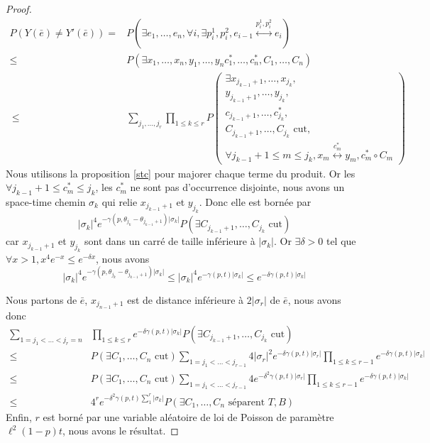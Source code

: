\documentclass[titlepage,a4paper,12pt]{article}
\newcounter{prop}
\begin{document}
\begin{proof}
\begin{align*}
P(Y(\bar{e})\neq Y'(\bar{e})) =& P(\exists e_1,\dots,e_n, \forall i, \exists p_i^1,p_i^2, e_{i-1}\overset{p_i^1,p_i^2}{\longleftrightarrow}e_i) \\
 \leqslant &P(\exists x_1,\dots,x_n,y_1,\dots,y_n c^*_1,\dots,c^*_n,C_1,\dots,C_n) \\\
 \leqslant &\sum_{j_1,\dots,j_r}\prod_{1\leqslant k \leqslant r} P\left(\begin{array}{c}
 \exists x_{j_{k-1}+1},\dots,x_{j_k},\\
 y_{j_{k-1}+1},\dots,y_{j_k},\\
 c_{j_{k-1}+1},\dots,c^*_{j_k},\\
 C_{j_{k-1}+1},\dots,C_{j_k} \text{ cut},\\
 \forall j_{k-1}+1 \leqslant m \leqslant j_k, x_m\overset{c^*_m}{\longleftrightarrow} y_m, 
 c^*_m\circ C_m
 \end{array}
 \right)
\end{align*}
Nous utilisons la proposition \ref{stc} pour majorer chaque terme du produit. Or les $\forall j_{k-1}+1 \leqslant c^*_m \leqslant j_k$, les $c^*_m$ ne sont pas d'occurrence disjointe, nous avons un space-time chemin $\sigma_k$ qui relie $x_{j_{k-1}+1}$ et $y_{j_k}$. Donc elle est bornée par $$ \displaystyle |\sigma_k|^4 e^{-\gamma(p,\theta_{j_k}-\theta_{j_{k-1}+1})|\sigma_k|} P(\exists C_{j_{k-1}+1},\dots,C_{j_k} \text{ cut})$$ car $x_{j_{k-1}+1}$ et $y_{j_k}$ sont dans un carré de taille inférieure à $ |\sigma_k|$. Or $\exists \delta>0$ tel que $\forall x>1, x^4e^{-x} \leqslant e^{-\delta x}$, nous avons 
$$|\sigma_k|^4 e^{-\gamma(p,\theta_{j_k}-\theta_{j_{k-1}+1})|\sigma_k|} \leqslant |\sigma_k|^4 e^{-\gamma(p,t)|\sigma_k|} \leqslant e^{-\delta\gamma(p,t)|\sigma_k|}$$

Nous partons de $\bar{e}$, $x_{j_{n-1}+1}$ est de distance inférieure à $2|\sigma_r|$ de $\bar{e}$, nous avons donc 
\begin{align*}\sum_{1=j_1<\dots < j_r = n} &\prod_{1\leqslant k \leqslant r} e^{-\delta \gamma(p,t)|\sigma_k|} P(\exists C_{j_{k-1}+1},\dots,C_{j_k} \text{ cut}) \\
\leqslant & P(\exists C_1,\dots,C_n \text{ cut})\sum_{1=j_1<\dots < j_{r-1}} 4|\sigma_r|^2e^{-\delta \gamma(p,t)|\sigma_r|}\prod_{1\leqslant k \leqslant r-1}e^{-\delta \gamma(p,t)|\sigma_k|} \\
\leqslant & P(\exists C_1,\dots,C_n \text{ cut})\sum_{1=j_1<\dots < j_{r-1}} 4e^{-\delta^2 \gamma(p,t)|\sigma_r|}\prod_{1\leqslant k \leqslant r-1}e^{-\delta \gamma(p,t)|\sigma_k|} \\
\leqslant & 4^r e^{-\delta^2 \gamma(p,t)\sum_1^r|\sigma_k|}P(\exists C_1,\dots,C_n \text{ séparent } T,B)
\end{align*}
Enfin, $r$ est borné par une variable aléatoire de loi de Poisson de paramètre $\ell^2 (1-p) t$, nous avons le résultat.
\end{proof}
\end{document}
